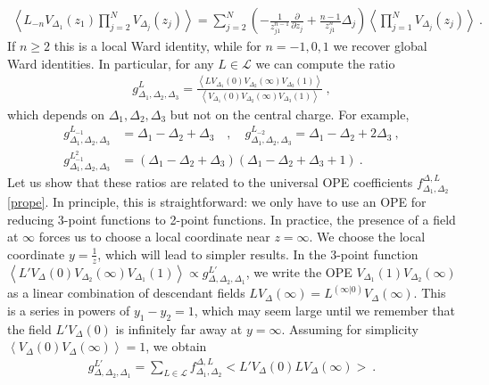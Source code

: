 \documentclass[12pt, a4paper]{article}
\theoremstyle{break}
\begin{document}
\begin{align}
 \left<L_{-n}V_{\Delta_1}(z_1)\prod_{j=2}^N V_{\Delta_j}(z_j)\right> = \sum_{j=2}^N \left(-\frac{1}{z_{j1}^{n-1}}\frac{\partial}{\partial z_j} +\frac{n-1}{z_{j1}^n} \Delta_j\right) \left<\prod_{j=1}^N V_{\Delta_j}(z_j)\right>\ . 
 \label{lwi}
\end{align}
If $n\geq 2$ this is a local Ward identity, while for $n=-1,0,1$ we recover global Ward identities. 
In particular, for any $L\in\mathcal{L}$ we can compute the ratio
\begin{align}
 g^L_{\Delta_1,\Delta_2,\Delta_3} = \frac{\left< LV_{\Delta_1}(0) V_{\Delta_2}(\infty)V_{\Delta_3}(1)\right>}{\left< V_{\Delta_1}(0) V_{\Delta_2}(\infty)V_{\Delta_3}(1)\right>}\ ,
 \label{gl}
\end{align}
which depends on $\Delta_1,\Delta_2,\Delta_3$ but not on the central charge. For example, 
\begin{subequations}
\label{gll}
\begin{align}
 g^{L_{-1}}_{\Delta_1,\Delta_2,\Delta_3}&= \Delta_1-\Delta_2+\Delta_3 \quad , \quad g^{L_{-2}}_{\Delta_1,\Delta_2,\Delta_3}= \Delta_1-\Delta_2+2\Delta_3 \ , 
 \\
 g^{L_{-1}^2}_{\Delta_1,\Delta_2,\Delta_3}&= \left(\Delta_1-\Delta_2+\Delta_3\right)\left(\Delta_1-\Delta_2+\Delta_3+1\right) \ .
\end{align}
\end{subequations}
Let us show that these ratios are related to the universal OPE coefficients $f^{\Delta, L}_{\Delta_1,\Delta_2}$ \eqref{prope}. In principle, this is straightforward: we only have to use an OPE for reducing 3-point functions to 2-point functions. In practice, the presence of a field at $\infty$ forces us to choose a local coordinate near $z=\infty$. We choose the local coordinate $y=\frac{1}{z}$, which will lead to simpler results. In the 3-point function $\left< L'V_\Delta(0)V_{\Delta_2}(\infty)V_{\Delta_1}(1)\right>\propto g^{L'}_{\Delta,\Delta_2,\Delta_1}$, we write the OPE $V_{\Delta_1}(1)V_{\Delta_2}(\infty)$ as a linear combination of descendant fields $LV_{\Delta}(\infty) = L^{(\infty|0)}V_{\Delta}(\infty)$. This is a series in powers of $y_1-y_2=1$, which may seem large until we remember that the field $L'V_{\Delta}(0)$ is infinitely far away at $y=\infty$. 
Assuming for simplicity $\left<V_\Delta(0) V_\Delta(\infty) \right>=1$, 
we obtain
\begin{align}
 g^{L'}_{\Delta,\Delta_2,\Delta_1}= \sum_{L\in\mathcal{L}} f^{\Delta,L}_{\Delta_1,\Delta_2} \Big<L'V_\Delta(0) LV_\Delta(\infty) \Big> \ .
 \label{gfr}
\end{align}
\end{document}
